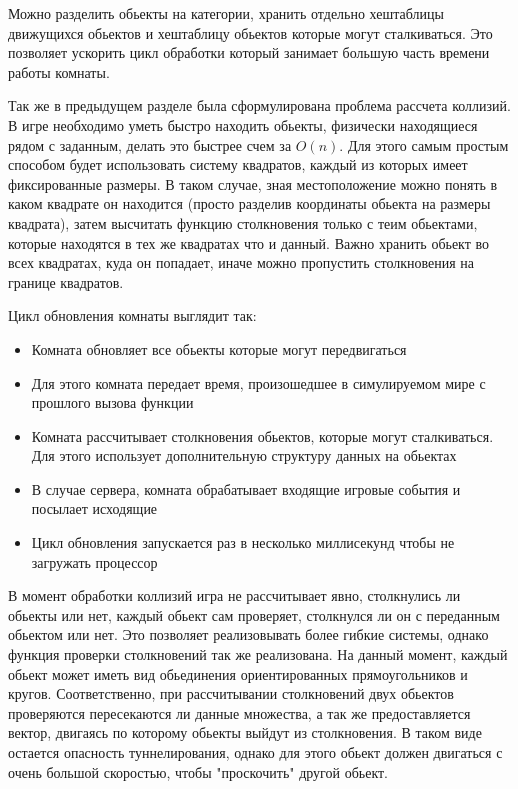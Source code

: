 \documentclass[a4paper,14pt, openany]{book}
\begin{document}
Можно разделить обьекты на категории, хранить отдельно хештаблицы движущихся обьектов и хештаблицу обьектов которые могут сталкиваться. Это позволяет ускорить цикл обработки который занимает большую часть времени работы комнаты.

Так же в предыдущем разделе была сформулирована проблема рассчета коллизий. В игре необходимо уметь быстро находить обьекты, физически находящиеся рядом с заданным, делать это быстрее счем за $O(n)$. Для этого самым простым способом будет использовать систему квадратов, каждый из которых имеет фиксированные размеры. В таком случае, зная местоположение можно понять в каком квадрате он находится (просто разделив координаты обьекта на размеры квадрата), затем высчитать функцию столкновения только с теим обьектами, которые находятся в тех же квадратах что и данный. Важно хранить обьект во всех квадратах, куда он попадает, иначе можно пропустить столкновения на границе квадратов.

Цикл обновления комнаты выглядит так:
\begin {itemize}
  \item Комната обновляет все обьекты которые могут передвигаться
  \item Для этого комната передает время, произошедшее в симулируемом мире с прошлого вызова функции
  \item Комната рассчитывает столкновения обьектов, которые могут сталкиваться. Для этого использует дополнительную структуру данных на обьектах
  \item В случае сервера, комната обрабатывает входящие игровые события и посылает исходящие 
  \item Цикл обновления запускается раз в несколько миллисекунд чтобы не загружать процессор
\end {itemize}

В момент обработки коллизий игра не рассчитывает явно, столкнулись ли обьекты или нет, каждый обьект сам проверяет, столкнулся ли он с переданным обьектом или нет. Это позволяет реализовывать более гибкие системы, однако функция проверки столкновений так же реализована. На данный момент, каждый обьект может иметь вид обьединения ориентированных прямоугольников и кругов. Соответственно, при рассчитывании столкновений двух обьектов проверяются пересекаются ли данные множества, а так же предоставляется вектор, двигаясь по которому обьекты выйдут из столкновения. В таком виде остается опасность туннелирования, однако для этого обьект должен двигаться с очень большой скоростью, чтобы "проскочить" другой обьект.
\end{document}
